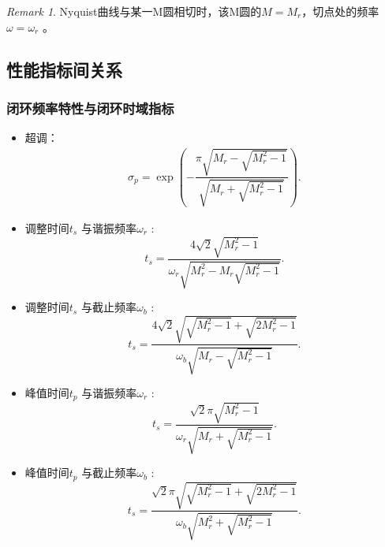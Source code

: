 \documentclass[14pt,a4paper]{article}
\theoremstyle{plain}
\theoremstyle{definition}
\theoremstyle{remark}
\newtheorem{rmk}{Remark}[section]
\theoremstyle{plain}
\theoremstyle{plain}
\theoremstyle{plain}
\theoremstyle{definition}
\theoremstyle{remark}
\numberwithin{equation}{section}
\begin{document}
			\begin{rmk}  
				Nyquist曲线与某一M圆相切时，该M圆的$M=M_r$，切点处的频率$\omega = \omega_r$ 。
			\end{rmk} 


		\subsection{性能指标间关系}%
		\label{sub:性能指标间关系}

			\subsubsection{闭环频率特性与闭环时域指标}%
			\label{ssub:闭环频率特性与闭环时域指标}
			
			\begin{itemize}
				\item 超调：
					\begin{align} 
					\label{eq:sp-mr}
						\sigma_p = \exp \left( -\dfrac{\pi \sqrt{M_r-\sqrt{M_r^2-1}}}{\sqrt{M_r+\sqrt{M_r^2-1}}} \right) 
					.\end{align} 
				\item 调整时间$t_s$ 与谐振频率$\omega_r$ : 
					\begin{equation}
					\label{eq:ts-wr-mr}
						t_s = \dfrac{4\sqrt{2}\sqrt{M_r^2-1} }{\omega_r \sqrt{M_r^2-M_r\sqrt{M_r^2-1}}} 
					.\end{equation} 
				\item 调整时间$t_s$ 与截止频率$\omega_b$ : 
					\begin{equation}
					\label{eq:ts-wb-mr}
						t_s = \dfrac{4\sqrt{2}\sqrt{\sqrt{M_r^2-1}+\sqrt{2M_r^2-1}}}{\omega_b \sqrt{M_r-\sqrt{M_r^2-1}}} 
					.\end{equation} 
				\item 峰值时间$t_p$ 与谐振频率$\omega_r$ : 
					\begin{equation}
					\label{eq:tp-wr-mr}
						t_s = \dfrac{\sqrt{2}\pi\sqrt{M_r^2-1} }{\omega_r \sqrt{M_r+\sqrt{M_r^2-1}}} 
					.\end{equation} 
				\item 峰值时间$t_p$ 与截止频率$\omega_b$ : 
					\begin{equation}
					\label{eq:tp-wb-mr}
						t_s = \dfrac{\sqrt{2}\pi\sqrt{\sqrt{M_r^2-1}+\sqrt{2M_r^2-1}}}{\omega_b \sqrt{M_r^2+\sqrt{M_r^2-1}}} 
					.\end{equation} 
					
			\end{itemize}
		
\end{document}
